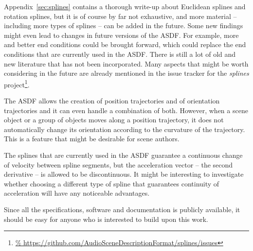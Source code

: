 Appendix~\ref{sec:splines} contains a thorough write-up about Euclidean splines
and rotation splines, but it is of course by far not exhaustive,
and more material
-- including more types of splines --
can be added in the future.
Some new findings might even lead to changes in future versions of the ASDF.
For example,
more and better end conditions could be brought forward,
which could replace the end conditions that are currently used in the ASDF.
There is still a lot of old and new literature that has not been incorporated.
Many aspects that might be worth considering in the future
are already mentioned in the issue tracker
for the \emph{splines} project\footnote{\url{%
https://github.com/AudioSceneDescriptionFormat/splines/issues}}.

The ASDF allows the creation of position trajectories and of orientation
trajectories and it can even handle a combination of both.
However, when a scene object or a group of objects moves
along a position trajectory, it does not automatically change its orientation
according to the curvature of the trajectory.
This is a feature that might be desirable for scene authors.

The splines that are currently used in the ASDF
guarantee a continuous change of velocity between spline segments,
but the acceleration vector
-- \ie the second derivative --
is allowed to be discontinuous.
It might be interesting to investigate whether
choosing a different type of spline that guarantees continuity of acceleration
will have any noticeable advantages.

Since all the specifications, software and documentation is publicly available,
it should be easy for anyone who is interested to build upon this work.
